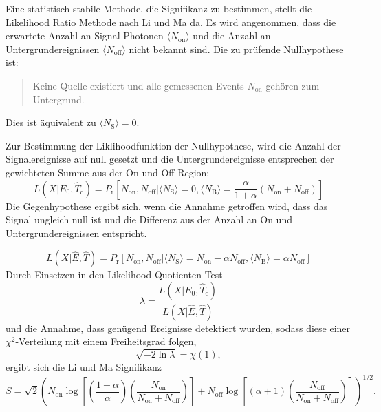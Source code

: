 Eine statistisch stabile Methode, die Signifikanz zu bestimmen, stellt die
Likelihood Ratio Methode nach Li und Ma da.
Es wird angenommen, dass die erwartete Anzahl an Signal
Photonen $\langle N_\text{on} \rangle$ und die Anzahl an Untergrundereignissen
$\langle N_\text{off} \rangle$ nicht bekannt sind.
Die zu prüfende Nullhypothese ist:
\begin{quote}
	Keine Quelle existiert und
    alle gemessenen Events $N_\text{on}$ gehören zum Untergrund.
\end{quote}
Dies ist äquivalent zu $\langle N_\text{S} \rangle=0$.

Zur Bestimmung der Liklihoodfunktion der Nullhypothese,
wird die Anzahl der Signalereignisse auf null gesetzt
und die Untergrundereignisse entsprechen der
gewichteten Summe aus der On und Off Region:
\begin{equation}
	L(X|E_0, \hat{T}_\text{c})= P_\text{r} \left[
		N_\text{on}, N_\text{off} |
		\langle N_\text{S} \rangle = 0,
		\langle N_\text{B} \rangle = \frac{\alpha}{1 + \alpha} (N_\text{on} +
			N_\text{off})
	\right]
\end{equation}
Die Gegenhypothese ergibt sich, 
wenn die Annahme getroffen wird, 
dass das Signal ungleich null ist 
und die Differenz aus der Anzahl an On und Untergrundereignissen entspricht.

\begin{equation}
	L(X|\hat{E}, \hat{T})= P_\text{r} \left[
		N_\text{on}, N_\text{off} |
		\langle N_\text{S} \rangle = N_\text{on} - \alpha N_\text{off},
		\langle N_\text{B} \rangle = \alpha N_\text{off}
	\right]
\end{equation}
Durch Einsetzen in den Likelihood Quotienten Test
\begin{equation}
	\lambda = \frac{L(X|E_0, \hat{T}_\text{c})}{L(X|\hat{E}, \hat{T})}
\end{equation}
und die Annahme, dass genügend Ereignisse detektiert wurden, sodass diese einer
$\chi^2$-Verteilung mit einem Freiheitsgrad folgen,
\begin{equation}
	\sqrt{- 2 \ln \lambda} = \chi(1),
\end{equation}
ergibt sich die Li und Ma Signifikanz
\begin{equation}
  S = \sqrt{2} {\left(
      N_\text{on} \log \left[
        \left( \frac{1 + \alpha}{\alpha} \right) \left(
          \frac{N_\text{on}}{N_\text{on} + N_\text{off}}
        \right)
      \right]
      + N_\text{off} \log \left[
        (\alpha + 1) \left(
          \frac{N_\text{off}}{N_\text{on} + N_\text{off}}
        \right)
      \right]
  \right)} ^ {1/2}.
\end{equation}

